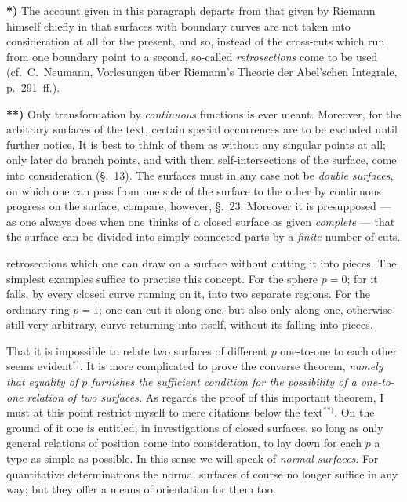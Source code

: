 \documentclass{article}
\begin{document}
\textbf{*)} The account given in this paragraph departs from that given by Riemann himself chiefly in that surfaces with boundary curves are not taken into consideration at all for the present, and so, instead of the cross-cuts which run from one boundary point to a second, so-called \emph{retrosections} come to be used (cf.\ C.\ Neumann, Vorlesungen über Riemann's Theorie der Abel'schen Integrale, p.~291~ff.).

\textbf{**)} Only transformation by \emph{continuous} functions is ever meant. Moreover, for the arbitrary surfaces of the text, certain special occurrences are to be excluded until further notice. It is best to think of them as without any singular points at all; only later do branch points, and with them self-intersections of the surface, come into consideration (§.~13). The surfaces must in any case not be \emph{double surfaces}, on which one can pass from one side of the surface to the other by continuous progress on the surface; compare, however, §.~23. Moreover it is presupposed --- as one always does when one thinks of a closed surface as given \emph{complete} --- that the surface can be divided into simply connected parts by a \emph{finite} number of cuts.

retrosections which one can draw on a surface without cutting it into pieces. The simplest examples suffice to practise this concept. For the sphere $p = 0$; for it falls, by every closed curve running on it, into two separate regions. For the ordinary ring $p = 1$; one can cut it along one, but also only along one, otherwise still very arbitrary, curve returning into itself, without its falling into pieces.

That it is impossible to relate two surfaces of different $p$ one-to-one to each other seems evident${}^{*)}$. It is more complicated to prove the converse theorem, \emph{namely that equality of $p$ furnishes the sufficient condition for the possibility of a one-to-one relation of two surfaces.} As regards the proof of this important theorem, I must at this point restrict myself to mere citations below the text${}^{**)}$. On the ground of it one is entitled, in investigations of closed surfaces, so long as only general relations of position come into consideration, to lay down for each $p$ a type as simple as possible. In this sense we will speak of \emph{normal surfaces}. For quantitative determinations the normal surfaces of course no longer suffice in any way; but they offer a means of orientation for them too.
\end{document}
